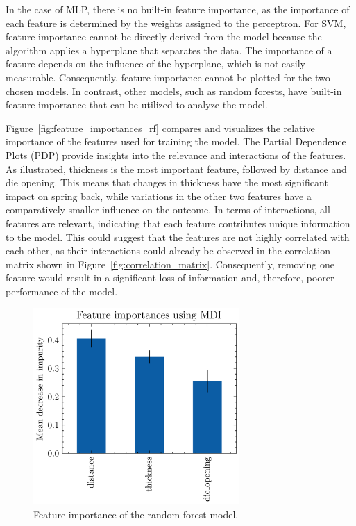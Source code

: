 In the case of \ac{MLP}, there is no built-in feature importance, as the importance of each feature is determined by
the weights assigned to the perceptron.
For \ac{SVM}, feature importance cannot be directly derived from the model
because the algorithm applies a hyperplane that separates the data.
The importance of a feature depends on the
influence of the hyperplane, which is not easily measurable.
Consequently, feature importance cannot be plotted for
the two chosen models.
In contrast, other models, such as random forests, have built-in feature importance that can
be utilized to analyze the model.


Figure~\ref{fig:feature_importances_rf} compares and visualizes the relative importance of the features used for
training the model.
The Partial Dependence Plots (PDP) provide insights into the relevance and interactions of the
features.
As illustrated, thickness is the most important feature, followed by distance and die opening.
This means
that changes in thickness have the most significant impact on spring back, while variations in the other two features
have a comparatively smaller influence on the outcome.
In terms of interactions, all features are relevant, indicating that each feature contributes unique information to
the model.
This could suggest that the features are not highly correlated with each other, as their interactions
could already be observed in the correlation matrix shown in Figure~\ref{fig:correlation_matrix}.
Consequently, removing one feature would result in a significant loss of information and, therefore, poorer
performance of the model.

\begin{figure}[h]
    \begin{tcolorbox}[arc=0pt,boxrule=0.5pt]
        \centering
        \includegraphics[width=0.7\textwidth]{chap5/images/rf_feature_importances}
    \end{tcolorbox}
    \caption{Feature importance of the random forest model.}
    \label{fig:feature-importances-rf}
\end{figure}

